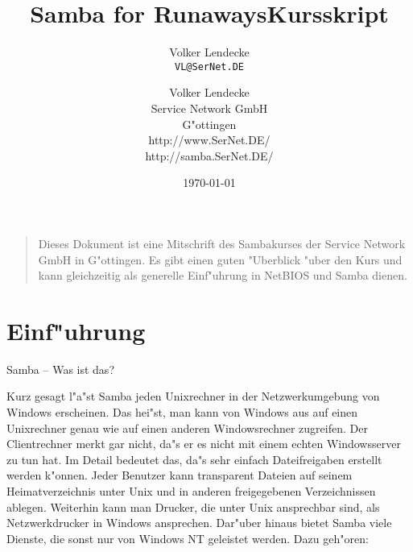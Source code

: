 \documentclass{scrartcl}\usepackage{pslatex}\typearea{12}
\author{Volker Lendecke\\\texttt{VL@SerNet.DE}}
\title{Samba for Runaways}
\begin{document}
\title{Kursskript\\[\baselineskip]
  }

\author{Volker Lendecke\\
Service Network GmbH\\
G"ottingen\\
http://www.SerNet.DE/\\
http://samba.SerNet.DE/}

\date{\today}

\maketitle
\thispagestyle{empty}

\begin{quote}
  Dieses Dokument ist eine Mitschrift des Sambakurses der Service
  Network GmbH in G"ottingen. Es gibt einen guten "Uberblick "uber den
  Kurs und kann gleichzeitig als generelle Einf"uhrung in NetBIOS und
  Samba dienen.
\end{quote}

\break

\tableofcontents

\break

\section{Einf"uhrung}

Samba -- Was ist das?

Kurz gesagt l"a"st Samba jeden Unixrechner in der Netzwerkumgebung von
Windows erscheinen. Das hei"st, man kann von Windows aus auf einen
Unixrechner genau wie auf einen anderen Windowsrechner zugreifen. Der
Clientrechner merkt gar nicht, da"s er es nicht mit einem echten
Windowsserver zu tun hat. Im Detail bedeutet das, da"s sehr einfach
Dateifreigaben erstellt werden k"onnen. Jeder Benutzer kann
transparent Dateien auf seinem Heimatverzeichnis unter Unix und in
anderen freigegebenen Verzeichnissen ablegen. Weiterhin kann man
Drucker, die unter Unix ansprechbar sind, als Netzwerkdrucker in
Windows ansprechen. Dar"uber hinaus bietet Samba viele Dienste, die
sonst nur von Windows NT geleistet werden. Dazu geh"oren:
\end{document}
